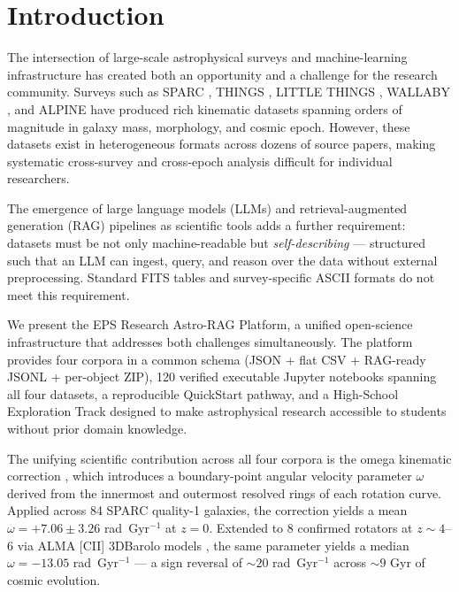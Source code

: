 \documentclass[twocolumn]{aastex631}
\begin{document}

\section{Introduction}
\label{sec:intro}

The intersection of large-scale astrophysical surveys and machine-learning
infrastructure has created both an opportunity and a challenge for the research
community. Surveys such as SPARC \citep{lelli2016}, THINGS \citep{walter2008},
LITTLE THINGS \citep{oh2015}, WALLABY \citep{koribalski2020}, and ALPINE
\citep{lefevre2020} have produced rich kinematic datasets spanning orders of
magnitude in galaxy mass, morphology, and cosmic epoch. However, these datasets
exist in heterogeneous formats across dozens of source papers, making systematic
cross-survey and cross-epoch analysis difficult for individual researchers.

The emergence of large language models (LLMs) and retrieval-augmented generation
(RAG) pipelines as scientific tools adds a further requirement: datasets must be
not only machine-readable but \emph{self-describing} --- structured such that an
LLM can ingest, query, and reason over the data without external preprocessing.
Standard FITS tables and survey-specific ASCII formats do not meet this
requirement.

We present the EPS Research Astro-RAG Platform, a unified open-science
infrastructure that addresses both challenges simultaneously. The platform
provides four corpora in a common schema (JSON + flat CSV + RAG-ready JSONL +
per-object ZIP), 120 verified executable Jupyter notebooks spanning all four
datasets, a reproducible QuickStart pathway, and a High-School Exploration
Track designed to make astrophysical research accessible to students without
prior domain knowledge.

The unifying scientific contribution across all four corpora is the omega
kinematic correction \citep{flynn2025}, which introduces a boundary-point
angular velocity parameter $\omega$ derived from the innermost and outermost
resolved rings of each rotation curve. Applied across 84 SPARC quality-1
galaxies, the correction yields a mean $\omega = +7.06 \pm 3.26$ rad~Gyr$^{-1}$
at $z = 0$. Extended to 8 confirmed rotators at $z \sim 4$--$6$ via ALMA
[CII] 3DBarolo models \citep{jones2021}, the same parameter yields a median
$\omega = -13.05$ rad~Gyr$^{-1}$ --- a sign reversal of $\sim 20$ rad~Gyr$^{-1}$
across $\sim 9$ Gyr of cosmic evolution.
\end{document}
